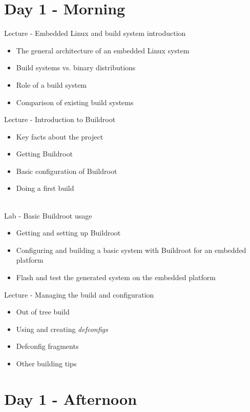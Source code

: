 \documentclass[a4paper,12pt,obeyspaces,spaces,hyphens]{article}
\begin{document}
\section{Day 1 - Morning}

\feagendatwocolumn
{Lecture - Embedded Linux and build system introduction}
{
  \begin{itemize}
  \item The general architecture of an embedded Linux system
  \item Build systems vs. binary distributions
  \item Role of a build system
  \item Comparison of existing build systems
  \end{itemize}
}
{Lecture - Introduction to Buildroot}
{
  \begin{itemize}
  \item Key facts about the project
  \item Getting Buildroot
  \item Basic configuration of Buildroot
  \item Doing a first build
  \end{itemize}
}
\\
\feagendatwocolumn
{Lab - Basic Buildroot usage}
{
  \begin{itemize}
  \item Getting and setting up Buildroot
  \item Configuring and building a basic system with Buildroot for an
    embedded platform
  \item Flash and test the generated system on the embedded platform
  \end{itemize}
}
{Lecture - Managing the build and configuration}
{
  \begin{itemize}
  \item Out of tree build
  \item Using and creating {\em defconfigs}
  \item Defconfig fragments
  \item Other building tips
  \end{itemize}
}

\section{Day 1 - Afternoon}
\end{document}

